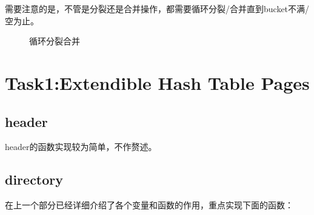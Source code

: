 \documentclass[a4paper]{article}
\begin{document}
需要注意的是，不管是分裂还是合并操作，都需要循环分裂/合并直到bucket不满/空为止。

\begin{figure}[h!]
   \centering
   \caption{循环分裂合并}
   \centering
   \label{fig:diff}
\end{figure}

\section{Task1:Extendible Hash Table Pages}

\subsection{header}

header的函数实现较为简单，不作赘述。

\subsection{directory}

在上一个部分已经详细介绍了各个变量和函数的作用，重点实现下面的函数：
\end{document}

